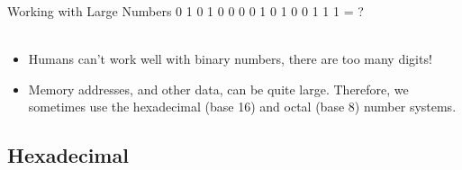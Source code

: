 \documentclass[graphics]{beamer}
\begin{document}
\begin{frame}{Working with Large Numbers}
    0 1 0 1 0 0 0 0 1 0 1 0 0 1 1 1 = ?
    \\ ~~ \\
    \begin{itemize}
        \item Humans can't work well with binary numbers, there are too many digits!
        \item Memory addresses, and other data, can be quite large. Therefore, we sometimes use the hexadecimal (base 16) and octal (base 8) number systems.
    \end{itemize}
\end{frame}

\subsection{Hexadecimal}
\end{document}
